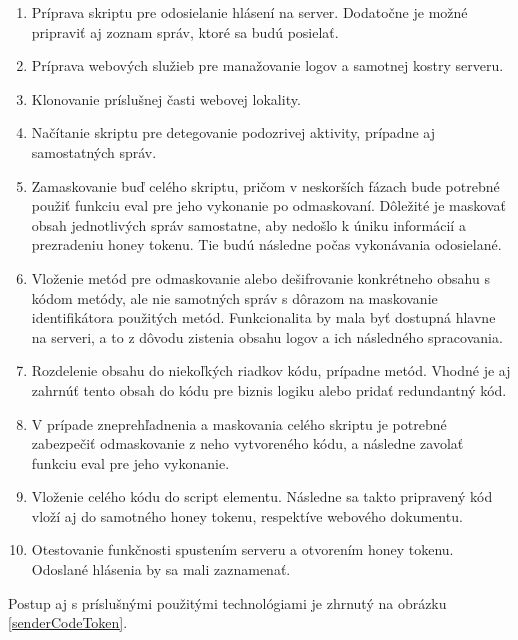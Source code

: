 \documentclass[conference, 11pt,slovak,a4paper,twoside]{IEEEtran}
\begin{document}
\begin{enumerate}
	\item Príprava skriptu pre odosielanie hlásení na server. Dodatočne je možné pripraviť aj zoznam správ, ktoré sa budú posielať.

	\item Príprava webových služieb pre manažovanie logov a samotnej kostry serveru.
	
	\item Klonovanie príslušnej časti webovej lokality.
	
	\item Načítanie skriptu pre detegovanie podozrivej aktivity, prípadne aj samostatných správ. 
	
	\item Zamaskovanie buď celého skriptu, pričom v neskorších fázach bude potrebné použiť funkciu eval pre jeho vykonanie po odmaskovaní. Dôležité je maskovať obsah jednotlivých správ samostatne, aby nedošlo k úniku informácií a prezradeniu honey tokenu. Tie budú následne počas vykonávania odosielané. 
	
	\item Vloženie metód pre odmaskovanie alebo dešifrovanie konkrétneho obsahu s kódom metódy, ale nie samotných správ s dôrazom na maskovanie identifikátora použitých metód. Funkcionalita by mala byť dostupná hlavne na serveri, a to z dôvodu zistenia obsahu logov a ich následného spracovania.
	
	\item Rozdelenie obsahu do niekoľkých riadkov kódu, prípadne metód. Vhodné je aj zahrnúť tento obsah do kódu pre biznis logiku alebo pridať redundantný kód.
	
	\item V prípade zneprehľadnenia a maskovania celého skriptu je potrebné zabezpečiť odmaskovanie z neho vytvoreného kódu, a následne zavolať funkciu eval pre jeho vykonanie.
	
	\item Vloženie celého kódu do script elementu. Následne sa takto pripravený kód vloží aj do samotného honey tokenu, respektíve webového dokumentu.
	
	\item Otestovanie funkčnosti spustením serveru a otvorením honey tokenu. Odoslané hlásenia by sa mali zaznamenať.
\end{enumerate}

Postup aj s príslušnými použitými technológiami je zhrnutý na obrázku \ref{senderCodeToken}.
\end{document}
